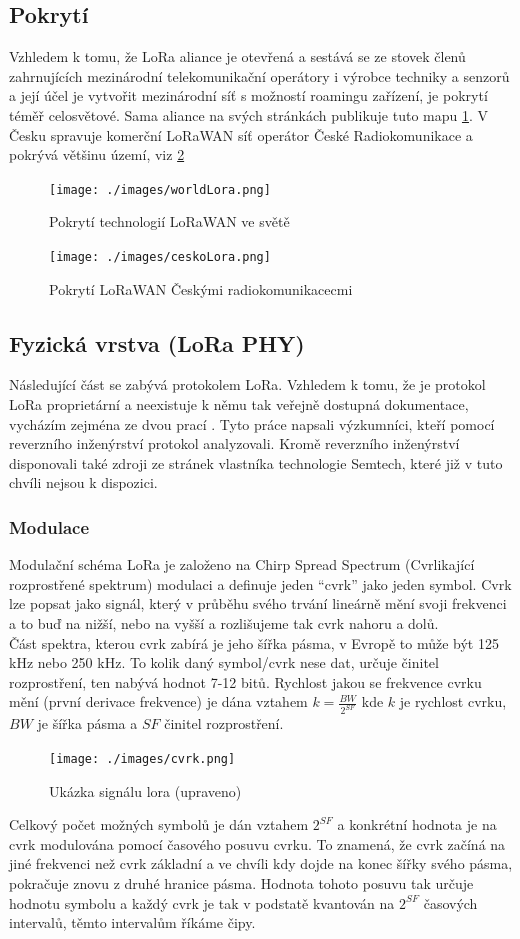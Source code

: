 \documentclass{ctuthesis}
\begin{document}
\subsection{Pokrytí}
Vzhledem k tomu, že LoRa aliance je otevřená a sestává se ze stovek členů zahrnujících mezinárodní telekomunikační operátory i výrobce techniky a senzorů a její účel je vytvořit mezinárodní síť s možností roamingu zařízení, je pokrytí téměř celosvětové. Sama aliance na svých stránkách publikuje tuto mapu \ref{worldLora}. V Česku spravuje komerční LoRaWAN síť operátor České Radiokomunikace a pokrývá většinu území, viz \ref{ceskoLora}
\begin{figure}
\caption{Pokrytí technologií LoRaWAN ve světě \cite{loraalliance}}
\texttt{[image: ./images/worldLora.png]}
\label{worldLora}
\end{figure}
\begin{figure}
\caption{Pokrytí LoRaWAN Českými radiokomunikacecmi \cite{cralora}}
\texttt{[image: ./images/ceskoLora.png]}
\label{ceskoLora}
\end{figure}
\subsection{Fyzická vrstva (LoRa PHY)}
Následující část se zabývá protokolem LoRa. Vzhledem k tomu, že je protokol LoRa proprietární a neexistuje k němu tak veřejně dostupná dokumentace, vycházím zejména ze dvou prací \cite{gr-lora2016} \cite{gr-lora2018}. Tyto práce napsali výzkumníci, kteří pomocí reverzního inženýrství protokol analyzovali. Kromě reverzního inženýrství disponovali také zdroji ze stránek vlastníka technologie Semtech, které již v tuto chvíli nejsou k dispozici.
\subsubsection{Modulace}
Modulační schéma LoRa je založeno na Chirp Spread Spectrum (Cvrlikající rozprostřené spektrum) modulaci  \cite{iotnetwroks2015} a definuje jeden “cvrk” jako jeden symbol. Cvrk lze popsat jako signál, který v průběhu svého trvání lineárně mění svoji frekvenci a to buď na nižší, nebo na vyšší a rozlišujeme tak cvrk nahoru a dolů.\\ 
Část spektra, kterou cvrk zabírá je jeho šířka pásma, v Evropě to může být 125 kHz nebo 250 kHz. To kolik daný symbol/cvrk nese dat, určuje činitel rozprostření, ten nabývá hodnot 7-12 bitů. Rychlost jakou se frekvence cvrku mění (první derivace frekvence) je dána vztahem $k = \frac{BW}{2^{SF}}$ kde $k$ je rychlost cvrku, $BW$ je šířka pásma a $SF$ činitel rozprostření.\\
\begin{figure}
\caption{Ukázka signálu lora  \cite{gr-lora2016} (upraveno)}
\texttt{[image: ./images/cvrk.png]}
\label{fig:lora12}
\end{figure}
Celkový počet možných symbolů je dán vztahem $2^{SF}$ a konkrétní hodnota je na cvrk modulována pomocí časového posuvu cvrku. To znamená, že cvrk začíná na jiné frekvenci než cvrk základní a ve chvíli kdy dojde na konec šířky svého pásma, pokračuje znovu z druhé hranice pásma. Hodnota tohoto posuvu tak určuje hodnotu symbolu a každý cvrk je tak v podstatě kvantován na $2^{SF}$ časových intervalů, těmto intervalům říkáme čipy.
\end{document}
